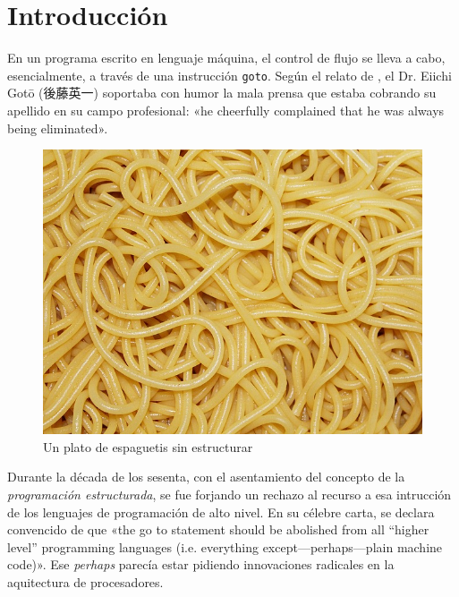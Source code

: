 \chapter{Introducción}

En un programa escrito en lenguaje máquina, el control de
flujo se lleva a cabo, esencialmente, a través de una
instrucción {\tt goto}. Según el relato de
\citet[p. 264]{1974_Knuth}, el Dr. Eiichi Gotō
%
%
({後藤英一}) soportaba con humor la mala
prensa que estaba cobrando su apellido en su campo
profesional: «he cheerfully complained that he was always
being eliminated».

\begin{figure}[ht!] %
\begin{center}
\includegraphics[width=.7\linewidth]{espaguetis}
\end{center}
\caption{Un plato de espaguetis sin estructurar}
\label{fig_pro}
\end{figure}


Durante la década de los sesenta, con el asentamiento del
concepto de la \emph{programación estructurada}, se fue
forjando un rechazo al recurso a esa intrucción de los
lenguajes de programación de alto nivel. En su célebre
carta, \citet{1968_Dijkstra} se declara convencido de que
«the go to statement should be abolished from all
  “higher level” programming languages (i.e. everything
  except—perhaps—plain machine code)». Ese \emph{perhaps}
parecía estar pidiendo innovaciones radicales en la
aquitectura de procesadores.

